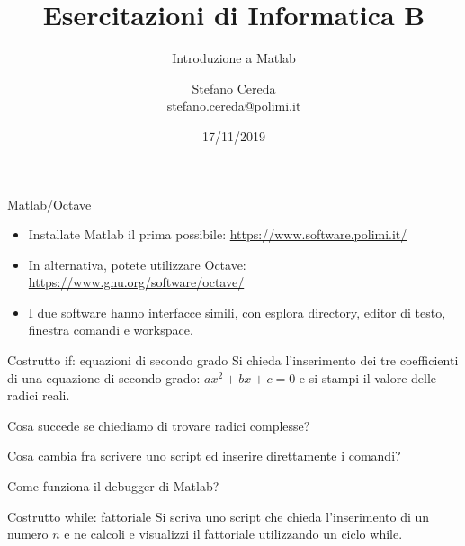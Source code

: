 \documentclass[aspectratio=169]{beamer}
\title{Esercitazioni di Informatica B}
\subtitle{Introduzione a Matlab}
\author{Stefano Cereda\\
	stefano.cereda@polimi.it
}
\date{17/11/2019}
\institute[PoliMi]{Politecnico Milano}
\begin{document}
	\begin{frame}
	\maketitle
\end{frame}



\begin{frame}{Matlab/Octave}
    \begin{itemize}
        \item Installate Matlab il prima possibile: \url{https://www.software.polimi.it/}
        \item In alternativa, potete utilizzare Octave: \url{https://www.gnu.org/software/octave/}
        \item I due software hanno interfacce simili, con esplora directory, editor di testo, finestra comandi e
            workspace.
    \end{itemize}
\end{frame}

\begin{frame}{Costrutto if: equazioni di secondo grado}
Si chieda l’inserimento dei tre coefficienti di una equazione di secondo grado: $ax^2+bx+c=0$ e si stampi il valore delle radici reali.


\pause
Cosa succede se chiediamo di trovare radici complesse?

\pause
Cosa cambia fra scrivere uno script ed inserire direttamente i comandi?

\pause
Come funziona il debugger di Matlab?
\end{frame}

\begin{frame}{Costrutto while: fattoriale}
Si scriva uno script che chieda l'inserimento di un numero $n$ e ne calcoli e visualizzi il fattoriale utilizzando un ciclo while.
\end{frame}
\end{document}
